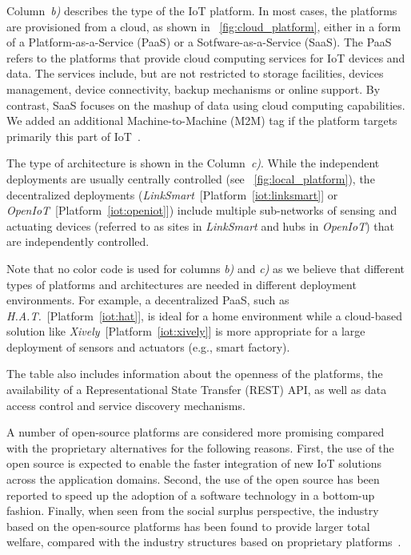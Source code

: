 \documentclass[preprint,10pt,5p]{elsarticle}
\newcommand{\citeiot}[1]{[Platform~\ref{#1}]}
\begin{document}
Column~\emph{b)} describes the type of the IoT platform. In most
cases, the platforms are provisioned from a cloud, as shown in 
\figurename{~\ref{fig:cloud_platform}}, either in a  form of a 
Platform-as-a-Service (PaaS) or a Sotfware-as-a-Service (SaaS). 
The PaaS refers to the platforms that provide cloud
computing services for IoT devices and data. 
The services include, but are not restricted to storage facilities,
devices  management, device connectivity, backup mechanisms or online
support. 
By contrast, SaaS focuses on the mashup of data using cloud computing
capabilities. We added an additional Machine-to-Machine (M2M) tag if
the platform targets primarily this part of IoT~\cite{Kim2014}.

The type of architecture is shown in the Column~\emph{c)}. 
While the independent deployments are usually centrally controlled
(see \figurename{~\ref{fig:local_platform}}), the decentralized
deployments
(\emph{LinkSmart\textsuperscript{\texttrademark}}~\citeiot{iot:linksmart}
or \emph{OpenIoT}~\citeiot{iot:openiot}) include multiple sub-networks
of sensing and actuating devices (referred to as sites in 
\emph{LinkSmart\textsuperscript{\texttrademark}} and hubs in
\emph{OpenIoT}) that are independently controlled.

Note that no color code is used for columns \emph{b)} and \emph{c)} 
as we believe that different types of platforms and architectures are 
needed in different deployment environments.
For example, a decentralized PaaS, such as
\emph{H.A.T.}~\citeiot{iot:hat}, is ideal for a home environment
while a cloud-based solution like \emph{Xively}~\citeiot{iot:xively}
is more appropriate for a large deployment of sensors and actuators
(e.g., smart factory).

The table also includes information about the openness of the
platforms, the availability of a Representational State Transfer
(REST) API, as well as data access control and service discovery
mechanisms.

A number of open-source platforms are considered more
promising compared with the proprietary alternatives for the
following reasons. 
First, the use of the open source is expected to enable the faster
integration of new IoT solutions across the application
domains. Second, the use of the open source has been reported to speed
up the adoption of a software technology in a bottom-up
fashion. Finally, when seen from the social surplus perspective, the
industry based on the open-source platforms has been found to provide larger total welfare, compared with the industry structures based
on proprietary platforms~\cite{Economides2006}.
\end{document}
